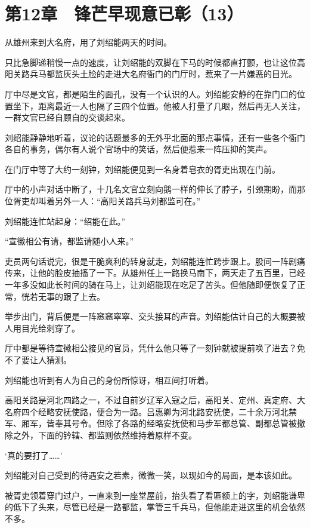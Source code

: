 \section{第12章　锋芒早现意已彰（13）}

从雄州来到大名府，用了刘绍能两天的时间。

只比急脚递稍慢一点的速度，让刘绍能的双脚在下马的时候都直打颤，也让这位高阳关路兵马都监灰头土脸的走进大名府衙门的门厅时，惹来了一片嫌恶的目光。

厅中尽是文官，都是陌生的面孔，没有一个认识的人。刘绍能安静的在靠门口的位置坐下，距离最近一人也隔了三四个位置。他被人打量了几眼，然后再无人关注，一群文官已经自顾自的交谈起来。

刘绍能静静地听着，议论的话题最多的无外乎北面的那点事情，还有一些各个衙门各自的事务，偶尔有人说个官场中的笑话，然后便惹来一阵压抑的笑声。

在门厅中等了大约一刻钟，刘绍能便见到一名身着皂衣的胥吏出现在门前。

厅中的小声对话中断了，十几名文官立刻向鹅一样的伸长了脖子，引颈期盼，而那位胥吏却叫着另外一人：“高阳关路兵马刘都监可在。”

刘绍能连忙站起身：“绍能在此。”

“宣徽相公有请，都监请随小人来。”

吏员两句话说完，很是干脆爽利的转身就走，刘绍能连忙跨步跟上。股间一阵剧痛传来，让他的脸皮抽搐了一下。从雄州任上一路换马南下，两天走了五百里，已经一年多没如此长时间的骑在马上，让刘绍能现在吃足了苦头。但他随即便恢复了正常，恍若无事的跟了上去。

举步出门，背后便是一阵窸窸窣窣、交头接耳的声音。刘绍能估计自己的大概要被人用目光给刺穿了。

厅中都是等待宣徽相公接见的官员，凭什么他只等了一刻钟就被提前唤了进去？免不了要让人猜测。

刘绍能也听到有人为自己的身份所惊讶，相互间打听着。

高阳关路是河北四路之一，不过自前岁辽军入寇之后，高阳关、定州、真定府、大名府四个经略安抚使路，便合为一路。吕惠卿为河北路安抚使，二十余万河北禁军、厢军，皆奉其号令。但除了各路的经略安抚使和马步军都总管、副都总管被撤除之外，下面的钤辖、都监则依然维持着原样不变。

‘真的要打了……’

刘绍能对自己受到的待遇安之若素，微微一笑，以现如今的局面，是本该如此。

被胥吏领着穿门过户，一直来到一座堂屋前，抬头看了看匾额上的字，刘绍能谦卑的低下了头来，尽管已经是一路都监，掌管三千兵马，但他能走进这里的机会依然不多。

